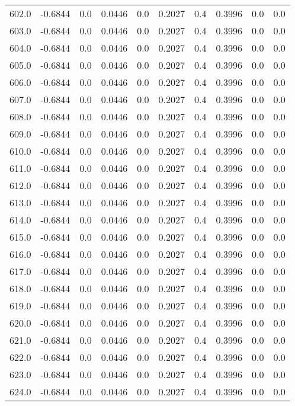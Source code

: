\begin{longtable}{lrrrrrrrrr}
602.0 & -0.6844 & 0.0 & 0.0446 & 0.0 & 0.2027 & 0.4 & 0.3996 & 0.0 & 0.0 \\
603.0 & -0.6844 & 0.0 & 0.0446 & 0.0 & 0.2027 & 0.4 & 0.3996 & 0.0 & 0.0 \\
604.0 & -0.6844 & 0.0 & 0.0446 & 0.0 & 0.2027 & 0.4 & 0.3996 & 0.0 & 0.0 \\
605.0 & -0.6844 & 0.0 & 0.0446 & 0.0 & 0.2027 & 0.4 & 0.3996 & 0.0 & 0.0 \\
606.0 & -0.6844 & 0.0 & 0.0446 & 0.0 & 0.2027 & 0.4 & 0.3996 & 0.0 & 0.0 \\
607.0 & -0.6844 & 0.0 & 0.0446 & 0.0 & 0.2027 & 0.4 & 0.3996 & 0.0 & 0.0 \\
608.0 & -0.6844 & 0.0 & 0.0446 & 0.0 & 0.2027 & 0.4 & 0.3996 & 0.0 & 0.0 \\
609.0 & -0.6844 & 0.0 & 0.0446 & 0.0 & 0.2027 & 0.4 & 0.3996 & 0.0 & 0.0 \\
610.0 & -0.6844 & 0.0 & 0.0446 & 0.0 & 0.2027 & 0.4 & 0.3996 & 0.0 & 0.0 \\
611.0 & -0.6844 & 0.0 & 0.0446 & 0.0 & 0.2027 & 0.4 & 0.3996 & 0.0 & 0.0 \\
612.0 & -0.6844 & 0.0 & 0.0446 & 0.0 & 0.2027 & 0.4 & 0.3996 & 0.0 & 0.0 \\
613.0 & -0.6844 & 0.0 & 0.0446 & 0.0 & 0.2027 & 0.4 & 0.3996 & 0.0 & 0.0 \\
614.0 & -0.6844 & 0.0 & 0.0446 & 0.0 & 0.2027 & 0.4 & 0.3996 & 0.0 & 0.0 \\
615.0 & -0.6844 & 0.0 & 0.0446 & 0.0 & 0.2027 & 0.4 & 0.3996 & 0.0 & 0.0 \\
616.0 & -0.6844 & 0.0 & 0.0446 & 0.0 & 0.2027 & 0.4 & 0.3996 & 0.0 & 0.0 \\
617.0 & -0.6844 & 0.0 & 0.0446 & 0.0 & 0.2027 & 0.4 & 0.3996 & 0.0 & 0.0 \\
618.0 & -0.6844 & 0.0 & 0.0446 & 0.0 & 0.2027 & 0.4 & 0.3996 & 0.0 & 0.0 \\
619.0 & -0.6844 & 0.0 & 0.0446 & 0.0 & 0.2027 & 0.4 & 0.3996 & 0.0 & 0.0 \\
620.0 & -0.6844 & 0.0 & 0.0446 & 0.0 & 0.2027 & 0.4 & 0.3996 & 0.0 & 0.0 \\
621.0 & -0.6844 & 0.0 & 0.0446 & 0.0 & 0.2027 & 0.4 & 0.3996 & 0.0 & 0.0 \\
622.0 & -0.6844 & 0.0 & 0.0446 & 0.0 & 0.2027 & 0.4 & 0.3996 & 0.0 & 0.0 \\
623.0 & -0.6844 & 0.0 & 0.0446 & 0.0 & 0.2027 & 0.4 & 0.3996 & 0.0 & 0.0 \\
624.0 & -0.6844 & 0.0 & 0.0446 & 0.0 & 0.2027 & 0.4 & 0.3996 & 0.0 & 0.0 \\

\end{longtable}
